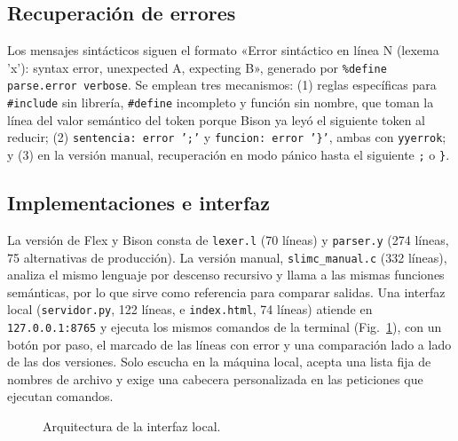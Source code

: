 \documentclass[runningheads]{llncs}
\begin{document}
\subsection{Recuperación de errores}
Los mensajes sintácticos siguen el formato «Error sintáctico en línea N (lexema 'x'): syntax error, unexpected A, expecting B», generado por \texttt{\%define parse.error verbose}. Se emplean tres mecanismos: (1) reglas específicas para \texttt{\#include} sin librería, \texttt{\#define} incompleto y función sin nombre, que toman la línea del valor semántico del token porque Bison ya leyó el siguiente token al reducir; (2) \texttt{sentencia: error ';'} y \texttt{funcion: error '\}'}, ambas con \texttt{yyerrok}; y (3) en la versión manual, recuperación en modo pánico hasta el siguiente \texttt{;} o \texttt{\}}.

\subsection{Implementaciones e interfaz}
La versión de Flex y Bison consta de \texttt{lexer.l} (70 líneas) y \texttt{parser.y} (274 líneas, 75 alternativas de producción). La versión manual, \texttt{slimc\_manual.c} (332 líneas), analiza el mismo lenguaje por descenso recursivo y llama a las mismas funciones semánticas, por lo que sirve como referencia para comparar salidas. Una interfaz local (\texttt{servidor.py}, 122 líneas, e \texttt{index.html}, 74 líneas) atiende en \texttt{127.0.0.1:8765} y ejecuta los mismos comandos de la terminal (Fig.~\ref{fig:int}), con un botón por paso, el marcado de las líneas con error y una comparación lado a lado de las dos versiones. Solo escucha en la máquina local, acepta una lista fija de nombres de archivo y exige una cabecera personalizada en las peticiones que ejecutan comandos.

\begin{figure}[t]
\centering
{}
\caption{Arquitectura de la interfaz local.}\label{fig:int}
\end{figure}
\end{document}
